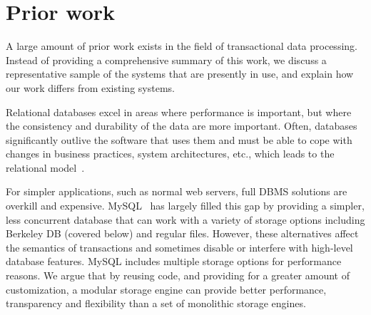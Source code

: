 \documentclass[10pt,letterpaper,twocolumn,english]{article}
\newcommand{\yad}{LLADD\xspace}
\begin{document}
\section{Prior work}

A large amount of prior work exists in the field of transactional data
processing.  Instead of providing a comprehensive summary of this
work, we discuss a representative sample of the systems that are
presently in use, and explain how our work differs from existing
systems.




Relational databases excel in areas
where performance is important, but where the consistency and
durability of the data are more important.  Often, databases significantly
outlive the software that uses them and must be able to cope with
changes in business practices, system architectures,
etc., which leads to the relational model~\cite{relational}.

For simpler applications, such as normal web servers, full DBMS
solutions are overkill and expensive.  MySQL~\cite{mysql} has
largely filled this gap by providing a simpler, less concurrent
database that can work with a variety of storage options including
Berkeley DB (covered below) and regular files.  However, these
alternatives affect the semantics of transactions and sometimes 
disable or interfere with high-level database features.  MySQL 
includes multiple storage options for performance reasons.  
We argue that by reusing code, and providing for a greater amount 
of customization, a modular storage engine can provide better 
performance, transparency and flexibility than a 
set of monolithic storage engines.

\end{document}

